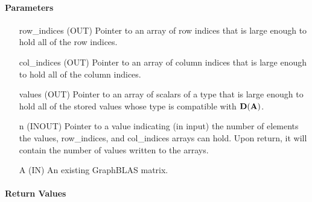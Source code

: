 \paragraph{Parameters}

\begin{itemize}[leftmargin=1.1in]
    \item[{\sf row\_indices}] ({\sf OUT}) Pointer to an array of row indices
                        that is large enough to hold all of the row indices.
    \item[{\sf col\_indices}] ({\sf OUT}) Pointer to an array of column indices
                        that is large enough to hold all of the column indices. 
    \item[{\sf values}] ({\sf OUT}) Pointer to an array of scalars of a type
                        that is large enough to hold all of the stored values whose
                        type is compatible with $\mathbf{D}({\bf A})$.
    \item[{\sf n}] ({\sf INOUT}) Pointer to a value indicating (in input) the number of
                        elements the {\sf values}, {\sf row\_indices}, and
                        {\sf col\_indices} arrays can hold. Upon return, it will contain the
                        number of values written to the arrays.
    \item[{\sf A}]      ({\sf IN}) An existing GraphBLAS matrix.
\end{itemize}

\paragraph{Return Values}

